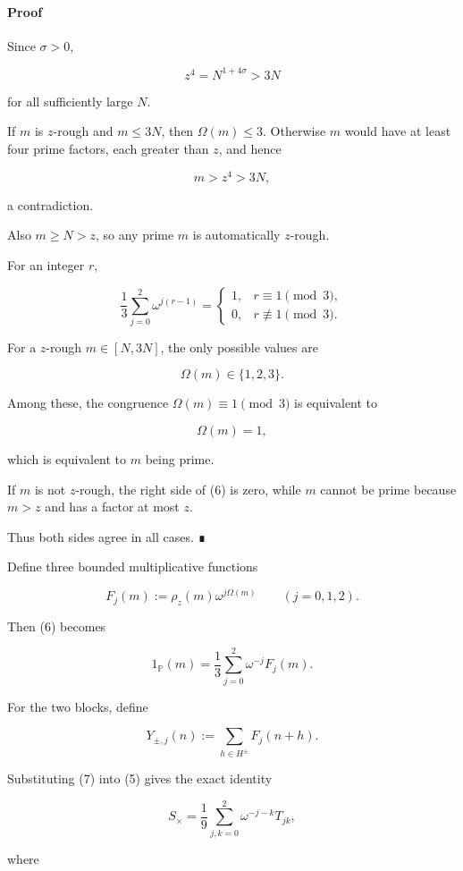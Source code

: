 \paragraph{Proof}

Since \(\sigma>0\),

\[
z^4=N^{1+4\sigma}>3N
\]

for all sufficiently large \(N\).

If \(m\) is \(z\)-rough and \(m\le3N\), then \(\Omega(m)\le3\). Otherwise \(m\) would have at least four prime factors, each greater than \(z\), and hence

\[
m>z^4>3N,
\]

a contradiction.

Also \(m\ge N>z\), so any prime \(m\) is automatically \(z\)-rough.

For an integer \(r\),

\[
\frac13\sum_{j=0}^2\omega^{j(r-1)}
=
\begin{cases}
1,&r\equiv1\pmod3,\\
0,&r\not\equiv1\pmod3.
\end{cases}
\]

For a \(z\)-rough \(m\in[N,3N]\), the only possible values are

\[
\Omega(m)\in\{1,2,3\}.
\]

Among these, the congruence \(\Omega(m)\equiv1\pmod3\) is equivalent to

\[
\Omega(m)=1,
\]

which is equivalent to \(m\) being prime.

If \(m\) is not \(z\)-rough, the right side of (6) is zero, while \(m\) cannot be prime because \(m>z\) and has a factor at most \(z\).

Thus both sides agree in all cases. ∎

Define three bounded multiplicative functions

\[
F_j(m):=\rho_z(m)\omega^{j\Omega(m)}
\qquad(j=0,1,2).
\]

Then (6) becomes

\[
1_{\mathbb P}(m)
=
\frac13
\sum_{j=0}^2\omega^{-j}F_j(m).
\tag{7}
\]

For the two blocks, define

\[
Y_{\pm,j}(n)
:=
\sum_{h\in H^\pm}F_j(n+h).
\]

Substituting (7) into (5) gives the exact identity

\[
\boxed{
S_\times
=
\frac19
\sum_{j,k=0}^2
\omega^{-j-k}T_{jk},
}
\tag{8}
\]

where

